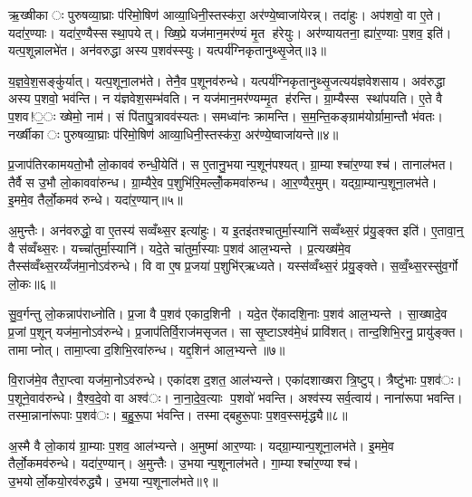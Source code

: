 ऋ॒ख्षीकाः पुरुषव्या॒घ्राः प॑रिमो॒षिण॑ आव्या॒धिनी॒स्तस्क॑रा॒ अर॑ण्ये॒ष्वाजा॑येरन्न्। तदा॑हुः। अप॑शवो॒ वा ए॒ते। यदा॑र॒ण्याः। यदा॑र॒ण्यैस्सस्था॒पयेत्। ख्षि॒प्रे यज॑मान॒मर॑ण्यं मृ॒त ह॑रेयुः। अर॑ण्यायतना॒ ह्या॑र॒ण्याः प॒शव॒ इति॑। यत्प॒शून्नालभे॑त। अन॑वरुद्धा अस्य प॒शव॑स्स्युः। यत्पर्य॑ग्निकृतानुथ्सृ॒जेत्॥३॥

य॒ज्ञ॒वे॒श॒सङ्कु॑र्यात्। यत्प॒शूना॒लभ॑ते। तेनै॒व प॒शूनव॑रुन्धे। यत्पर्य॑ग्निकृतानुथ्सृ॒जत्यय॑ज्ञवेशसाय। अव॑रुद्धा अस्य प॒शवो॒ भव॑न्ति। न य॑ज्ञवेश॒सम्भ॑वति। न यज॑मान॒मर॑ण्यम्मृ॒त ह॑रन्ति। ग्रा॒म्यैस्स स्था॑पयति। ए॒ते वै प॒शव!॒ः ख्षेमो॒ नाम॑। सं पि॑तापु॒त्रावव॑स्यतः। समध्वा॑नः क्रामन्ति। स॒म॒न्ति॒कङ्ग्राम॑योर्ग्रामा॒न्तौ भ॑वतः। नर्ख्षीकाः पुरुषव्या॒घ्राः प॑रिमो॒षिण॑ आव्या॒धिनी॒स्तस्क॑रा॒ अर॑ण्ये॒ष्वाजा॑यन्ते॥४॥


प्र॒जाप॑तिरकामयतो॒भौ लो॒कावव॑ रुन्धी॒येति॑। स ए॒तानु॒भयान्प॒शून॑पश्यत्। ग्रा॒म्याश्चा॑र॒ण्याश्च॑। तानाल॑भत। तैर्वै स उ॒भौ लो॒काववा॑रुन्ध। ग्रा॒म्यैरे॒व प॒शुभि॑रि॒मल्लोँ॒कमवा॑रुन्ध। आ॒र॒ण्यैर॒मुम्। यद्ग्रा॒म्यान्प॒शूना॒लभ॑ते। इ॒ममे॒व तैर्लो॒कमव॑ रुन्धे। यदा॑र॒ण्यान्॥५॥

अ॒मुन्तैः। अन॑वरुद्धो॒ वा ए॒तस्य॑ सव्वँथ्स॒र इत्या॑हुः। य इ॒तइ॑तश्चातुर्मा॒स्यानि॑ सव्वँथ्स॒रं प्र॑यु॒ङ्क्त इति॑। ए॒तावा॒न्॒ वै स॑व्वँथ्स॒रः। यच्चा॑तुर्मा॒स्यानि॑। यदे॒ते चा॑तुर्मा॒स्याः प॒शव॑ आल॒भ्यन्ते। प्र॒त्यख्ष॑मे॒व तैस्स॑व्वँथ्स॒रय्यँज॑मा॒नोऽव॑रुन्धे। वि वा ए॒ष प्र॒जया॑ प॒शुभि॑र्‌ऋध्यते। यस्स॑व्वँथ्स॒रं प्र॑यु॒ङ्क्ते। स॒व्वँ॒थ्स॒रस्सु॑व॒र्गो लो॒कः॥६॥

सु॒व॒र्गन्तु लो॒कन्नाप॑राध्नोति। प्र॒जा वै प॒शव॑ एकाद॒शिनी। यदे॒त ऐ॑कादशि॒नाः प॒शव॑ आल॒भ्यन्ते। सा॒ख्षादे॒व प्र॒जां प॒शून् यज॑मा॒नोऽव॑रुन्धे। प्र॒जाप॑तिर्वि॒राज॑मसृजत। सा सृ॒ष्टाऽश्व॑मे॒धं प्रावि॑शत्। तान्द॒शिभि॒रनु॒ प्रायु॑ङ्क्त। तामाप्नोत्। तामा॒प्त्वा द॒शिभि॒रवा॑रुन्ध। यद्द॒शिन॑ आल॒भ्यन्ते॥७॥

वि॒राज॑मे॒व तैरा॒प्त्वा यज॑मा॒नोऽव॑रुन्धे। एका॑दश द॒शत॒ आल॑भ्यन्ते। एका॑दशाख्षरा त्रि॒ष्टुप्। त्रैष्टु॑भाः प॒शव॑ः। प॒शूने॒वाव॑रुन्धे। वै॒श्व॒दे॒वो वा अश्व॑ः। ना॒ना॒दे॒व॒त्याः प॒शवो॑ भवन्ति। अश्व॑स्य सर्व॒त्वाय॑। नाना॑रूपा भवन्ति। तस्मा॒न्नाना॑रूपाः प॒शव॑ः। ब॒हु॒रू॒पा भ॑वन्ति। तस्माद्बहुरू॒पाः प॒शव॒स्समृ॑द्ध्यै॥८॥


अ॒स्मै वै लो॒काय॑ ग्रा॒म्याः प॒शव॒ आल॑भ्यन्ते। अ॒मुष्मा॑ आर॒ण्याः। यद्ग्रा॒म्यान्प॒शूना॒लभ॑ते। इ॒ममे॒व तैर्लो॒कमव॑रुन्धे। यदा॑र॒ण्यान्। अ॒मुन्तैः। उ॒भयान्प॒शूनाल॑भते। गा॒म्याश्चा॑र॒ण्याश्च॑। उ॒भयोर्लो॒कयो॒रव॑रुद्ध्यै। उ॒भयान्प॒शूनाल॑भते॥९॥

